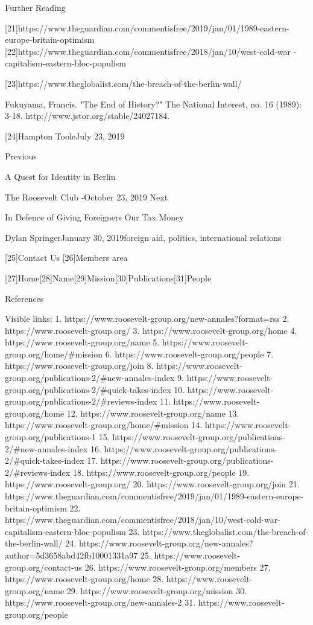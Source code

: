 Further Reading

   [21]https://www.theguardian.com/commentisfree/2019/jan/01/1989-eastern-
   europe-britain-optimism
   [22]https://www.theguardian.com/commentisfree/2018/jan/10/west-cold-war
   -capitalism-eastern-bloc-populism

   [23]https://www.theglobalist.com/the-breach-of-the-berlin-wall/

   Fukuyama, Francis. "The End of History?" The National Interest, no. 16
   (1989): 3-18. http://www.jstor.org/stable/24027184.

   [24]Hampton TooleJuly 23, 2019

   Previous

A Quest for Identity in Berlin

   The Roosevelt Club -October 23, 2019
   Next

In Defence of Giving Foreigners Our Tax Money

   Dylan SpringerJanuary 30, 2019foreign aid, politics, international
   relations

   [25]Contact Us
   [26]Members area

   [27]Home[28]Name[29]Mission[30]Publications[31]People

References

   Visible links:
   1. https://www.roosevelt-group.org/new-annales?format=rss
   2. https://www.roosevelt-group.org/
   3. https://www.roosevelt-group.org/home
   4. https://www.roosevelt-group.org/name
   5. https://www.roosevelt-group.org/home/#mission
   6. https://www.roosevelt-group.org/people
   7. https://www.roosevelt-group.org/join
   8. https://www.roosevelt-group.org/publications-2/#new-annales-index
   9. https://www.roosevelt-group.org/publications-2/#quick-takes-index
  10. https://www.roosevelt-group.org/publications-2/#reviews-index
  11. https://www.roosevelt-group.org/home
  12. https://www.roosevelt-group.org/name
  13. https://www.roosevelt-group.org/home/#mission
  14. https://www.roosevelt-group.org/publications-1
  15. https://www.roosevelt-group.org/publications-2/#new-annales-index
  16. https://www.roosevelt-group.org/publications-2/#quick-takes-index
  17. https://www.roosevelt-group.org/publications-2/#reviews-index
  18. https://www.roosevelt-group.org/people
  19. https://www.roosevelt-group.org/
  20. https://www.roosevelt-group.org/join
  21. https://www.theguardian.com/commentisfree/2019/jan/01/1989-eastern-europe-britain-optimism
  22. https://www.theguardian.com/commentisfree/2018/jan/10/west-cold-war-capitalism-eastern-bloc-populism
  23. https://www.theglobalist.com/the-breach-of-the-berlin-wall/
  24. https://www.roosevelt-group.org/new-annales?author=5d3658abd42fb10001331a97
  25. https://www.roosevelt-group.org/contact-us
  26. https://www.roosevelt-group.org/members
  27. https://www.roosevelt-group.org/home
  28. https://www.roosevelt-group.org/name
  29. https://www.roosevelt-group.org/mission
  30. https://www.roosevelt-group.org/new-annales-2
  31. https://www.roosevelt-group.org/people

